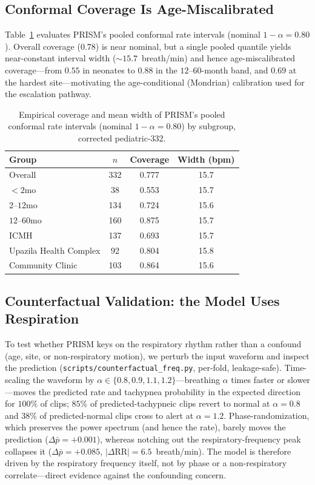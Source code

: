 \subsection{Conformal Coverage Is Age-Miscalibrated}
Table~\ref{tab:conformal_cov} evaluates PRISM's pooled conformal rate intervals (nominal $1-\alpha=0.80$).
Overall coverage ($0.78$) is near nominal, but a single pooled quantile yields near-constant interval width
($\sim$$15.7$~breath/min) and hence age-miscalibrated coverage---from $0.55$ in neonates to $0.88$ in the
$12$--$60$-month band, and $0.69$ at the hardest site---motivating the age-conditional (Mondrian)
calibration used for the escalation pathway.

\begin{table}[!t]\centering\small
\caption{Empirical coverage and mean width of PRISM's pooled conformal rate intervals (nominal
$1-\alpha=0.80$) by subgroup, corrected pediatric-332.}
\label{tab:conformal_cov}
\begin{tabular}{@{}lccc@{}}
\toprule
Group & $n$ & Coverage & Width (bpm)\\
\midrule
Overall & 332 & 0.777 & 15.7\\
\midrule
$<2$mo   & 38  & 0.553 & 15.7\\
$2$--$12$mo  & 134 & 0.724 & 15.6\\
$12$--$60$mo & 160 & 0.875 & 15.7\\
\midrule
ICMH & 137 & 0.693 & 15.7\\
Upazila Health Complex & 92 & 0.804 & 15.8\\
Community Clinic & 103 & 0.864 & 15.6\\
\bottomrule
\end{tabular}
\end{table}

\subsection{Counterfactual Validation: the Model Uses Respiration}
To test whether PRISM keys on the respiratory rhythm rather than a confound (age, site, or non-respiratory
motion), we perturb the input waveform and inspect the prediction (\texttt{scripts/counterfactual\_freq.py},
per-fold, leakage-safe). Time-scaling the waveform by $\alpha\in\{0.8,0.9,1.1,1.2\}$---breathing $\alpha$
times faster or slower---moves the predicted rate and tachypnea probability in the expected direction for
\emph{$100\%$} of clips; $85\%$ of predicted-tachypneic clips revert to normal at $\alpha{=}0.8$ and $38\%$
of predicted-normal clips cross to alert at $\alpha{=}1.2$. Phase-randomization, which preserves the power
spectrum (and hence the rate), barely moves the prediction ($\Delta\bar p={+}0.001$), whereas notching out
the respiratory-frequency peak collapses it ($\Delta\bar p={+}0.085$, $|\Delta\mathrm{RR}|{=}6.5$~breath/min).
The model is therefore driven by the respiratory frequency itself, not by phase or a non-respiratory
correlate---direct evidence against the confounding concern.

